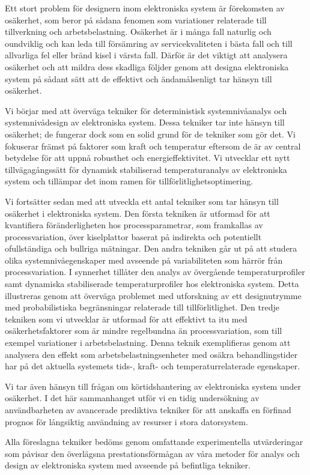 Ett stort problem för designern inom elektroniska system är förekomsten av
osäkerhet, som beror på sådana fenomen som variationer relaterade till
tillverkning och arbetsbelastning. Osäkerhet är i många fall naturlig och
oundviklig och kan leda till försämring av servicekvaliteten i bästa fall och
till allvarliga fel eller bränd kisel i värsta fall. Därför är det viktigt att
analysera osäkerhet och att mildra dess skadliga följder genom att designa
elektroniska system på sådant sätt att de effektivt och ändamålsenligt tar
hänsyn till osäkerhet.

Vi börjar med att överväga tekniker för deterministisk systemnivåanalys och
systemnivådesign av elektroniska system. Dessa tekniker tar inte hänsyn till
osäkerhet; de fungerar dock som en solid grund för de tekniker som gör det. Vi
fokuserar främst på faktorer som kraft och temperatur eftersom de är av central
betydelse för att uppnå robusthet och energieffektivitet. Vi utvecklar ett nytt
tillvägagångssätt för dynamisk stabiliserad temperaturanalys av elektroniska
system och tillämpar det inom ramen för tillförlitlighetsoptimering.

Vi fortsätter sedan med att utveckla ett antal tekniker som tar hänsyn till
osäkerhet i elektroniska system. Den första tekniken är utformad för att
kvantifiera föränderligheten hos processparametrar, som framkallas av
processvariation, över kiselplattor baserat på indirekta och potentiellt
ofullständiga och bullriga mätningar. Den andra tekniken går ut på att studera
olika systemnivåegenskaper med avseende på variabiliteten som härrör från
processvariation. I synnerhet tillåter den analys av övergående
temperaturprofiler samt dynamiska stabiliserade temperaturprofiler hos
elektroniska system. Detta illustreras genom att överväga problemet med
utforskning av ett designutrymme med probabilistiska begränsningar relaterade
till tillförlitlighet. Den tredje tekniken som vi utvecklar är utformad för att
effektivt ta itu med osäkerhetsfaktorer som är mindre regelbundna än
processvariation, som till exempel variationer i arbetsbelastning. Denna teknik
exemplifieras genom att analysera den effekt som arbetsbelastningsenheter med
osäkra behandlingstider har på det aktuella systemets tids-, kraft- och
temperaturrelaterade egenskaper.

Vi tar även hänsyn till frågan om körtidshantering av elektroniska system under
osäkerhet. I det här sammanhanget utför vi en tidig undersökning av
användbarheten av avancerade prediktiva tekniker för att anskaffa en förfinad
prognos för långsiktig användning av resurser i stora datorsystem.

Alla föreslagna tekniker bedöms genom omfattande experimentella utvärderingar
som påvisar den överlägsna prestationsförmågan av våra metoder för analys och
design av elektroniska system med avseende på befintliga tekniker.


